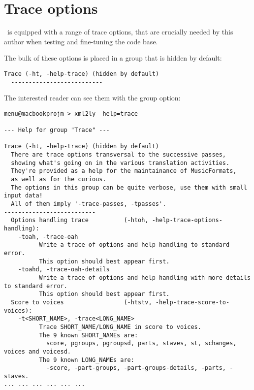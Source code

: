 



\chapter{Trace options}

\xmlToLy\ is equipped with a range of trace options, that are crucially needed by this author when testing and fine-tuning the code base.

The bulk of these options is placed in a group that is hidden by default:
\begin{lstlisting}[language=MusicXML]
  Trace (-ht, -help-trace) (hidden by default)
  --------------------------
\end{lstlisting}

The interested reader can see them with the  group option:
\begin{lstlisting}[language=MusicXML]
menu@macbookprojm > xml2ly -help=trace

--- Help for group "Trace" ---

Trace (-ht, -help-trace) (hidden by default)
  There are trace options transversal to the successive passes,
  showing what's going on in the various translation activities.
  They're provided as a help for the maintainance of MusicFormats,
  as well as for the curious.
  The options in this group can be quite verbose, use them with small input data!
  All of them imply '-trace-passes, -tpasses'.
--------------------------
  Options handling trace          (-htoh, -help-trace-options-handling):
    -toah, -trace-oah
          Write a trace of options and help handling to standard error.
          This option should best appear first.
    -toahd, -trace-oah-details
          Write a trace of options and help handling with more details to standard error.
          This option should best appear first.
  Score to voices                 (-htstv, -help-trace-score-to-voices):
    -t<SHORT_NAME>, -trace<LONG_NAME>
          Trace SHORT_NAME/LONG_NAME in score to voices.
          The 9 known SHORT_NAMEs are:
            score, pgroups, pgroupsd, parts, staves, st, schanges, voices and voicesd.
          The 9 known LONG_NAMEs are:
            -score, -part-groups, -part-groups-details, -parts, -staves.
... ... ... ... ... ...
\end{lstlisting}

